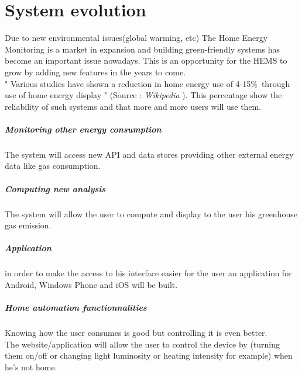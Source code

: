 \chapter{System evolution}
\label{ch:evolution}
Due to new environmental issues(global warming, etc) The Home Energy Monitoring is a market in expansion and building green-friendly systems has become an important issue nowadays. This is an opportunity for the HEMS to grow by adding new features in the years to come. \\
" Various studies have shown a reduction in home energy use of 4-15\%\ through use of home energy display " (Source : \textit{Wikipedia} ). This percentage show the reliability of such systems and that more and more users will use them. 

 \paragraph{Monitoring other energy consumption}
 The system will access new API and data stores providing other external energy data like gas consumption. 

 \paragraph{Computing new analysis}
The system will allow the user to compute and display to the user his greenhouse gas emission.

 \paragraph{Application}
 in order to make the access to his interface easier for the user an application for Android, Windows Phone and iOS will be built.
  
 \paragraph{Home automation functionnalities}
 Knowing how the user consumes is good but controlling it is even better. \\
The website/application will allow the user to control the device by (turning them on/off or changing light luminosity or heating intensity for example) when he's not home.
